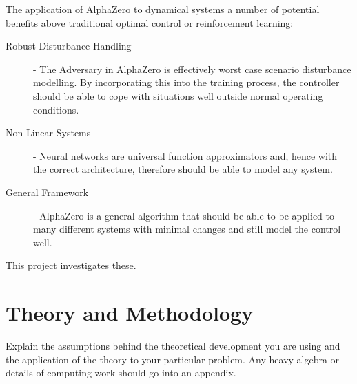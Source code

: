 \documentclass[main.tex]{subfiles}
\begin{document}
The application of AlphaZero to dynamical systems a number of potential benefits above traditional optimal control or reinforcement learning:
\begin{description}
    \item[Robust Disturbance Handling] - The Adversary in AlphaZero is effectively worst case scenario disturbance modelling. By incorporating this into the training process, the controller should be able to cope with situations well outside normal operating conditions.
    \item[Non-Linear Systems] - Neural networks are universal function approximators and, hence with the correct architecture, therefore should be able to model any system.
    \item[General Framework] - AlphaZero is a general algorithm that should be able to be applied to many different systems with minimal changes and still model the control well. 
\end{description}

This project investigates these.

\chapter{Theory and Methodology}
Explain the assumptions behind the theoretical development you are using and the application of the theory to your particular problem. Any heavy algebra or details of computing work should go into an appendix.
\end{document}
